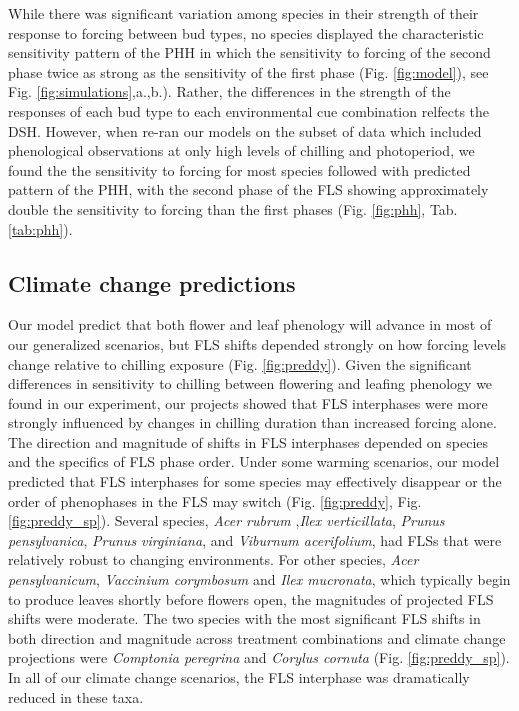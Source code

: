 \documentclass[11pt]{article}\usepackage[]{graphicx}\usepackage[]{color}
\begin{document}
\noindent While there was significant variation among species in their strength of their response to forcing between bud types, no species displayed the characteristic sensitivity pattern of the PHH in which the sensitivity to forcing of the second phase twice as strong as the sensitivity of the first phase (Fig. \ref{fig:model}), see Fig. \ref{fig:simulations},a.,b.). Rather, the differences in the strength of the responses of each bud type to each environmental cue combination relfects the DSH. However, when re-ran our models on the subset of data which included phenological observations at only high levels of chilling and photoperiod, we found the the sensitivity to forcing for most species followed with predicted pattern of the PHH, with the second phase of the FLS showing approximately double the sensitivity to forcing than the first phases (Fig. \ref{fig:phh}, Tab. \ref{tab:phh}).\\

\subsection*{Climate change predictions}
\noindent Our model predict that both flower and leaf phenology will advance in most of our generalized scenarios, but FLS shifts depended strongly on how forcing levels change relative to chilling exposure (Fig. \ref{fig:preddy}). Given the significant differences in sensitivity to chilling between flowering and leafing phenology we found in our experiment, our projects showed that FLS interphases were more strongly influenced by changes in chilling duration than increased forcing alone.\\

\noindent The direction and magnitude of shifts in FLS interphases depended on species and the specifics of FLS phase order. Under some warming scenarios, our model predicted that  FLS interphases for some species may effectively disappear or the order of phenophases in the FLS may switch (Fig. \ref{fig:preddy}, Fig. \ref{fig:preddy_sp}). Several species, \textit{Acer rubrum} ,\textit{Ilex verticillata}, \textit{Prunus pensylvanica}, \textit{Prunus virginiana}, and \textit{Viburnum acerifolium}, had FLSs that were relatively robust to changing environments. For other species, \textit{Acer pensylvanicum}, \textit{Vaccinium corymbosum} and \textit{Ilex mucronata}, which typically begin to produce leaves shortly before flowers open, the magnitudes of projected FLS shifts were moderate. The two species with the most significant FLS shifts in both direction and magnitude across treatment combinations and climate change projections were \textit{Comptonia peregrina} and \textit{Corylus cornuta} (Fig. \ref{fig:preddy_sp}). In all of our climate change scenarios, the FLS interphase was dramatically reduced in these taxa.\\
\end{document}

